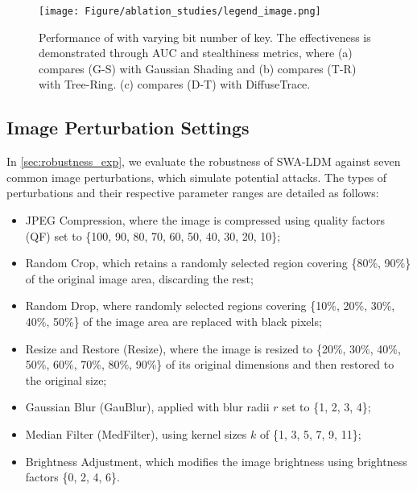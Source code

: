 
\begin{figure*}[t]
    \centering
    \begin{minipage}{\linewidth}
        \centering
        \texttt{[image: Figure/ablation\_studies/legend\_image.png]} 
    \end{minipage}
    \caption{Performance of \tool with varying bit number of key. The effectiveness is demonstrated through AUC and stealthiness metrics, where (a) compares \tool(G-S) with Gaussian Shading and (b) compares \tool(T-R) with Tree-Ring. (c) compares \tool(D-T) with DiffuseTrace.}
    
    \label{fig:keybit}
\end{figure*}

\subsection{Image Perturbation Settings}
In \cref{sec:robustness_exp}, we evaluate the robustness of SWA-LDM against seven common image perturbations, which simulate potential attacks. The types of perturbations and their respective parameter ranges are detailed as follows:
\begin{itemize}
\item {JPEG Compression}, where the image is compressed using quality factors (QF) set to \{100, 90, 80, 70, 60, 50, 40, 30, 20, 10\}; 
\item {Random Crop}, which retains a randomly selected region covering \{80\%, 90\%\} of the original image area, discarding the rest; 
\item {Random Drop}, where randomly selected regions covering \{10\%, 20\%, 30\%, 40\%, 50\%\} of the image area are replaced with black pixels; 
\item {Resize and Restore} (Resize), where the image is resized to \{20\%, 30\%, 40\%, 50\%, 60\%, 70\%, 80\%, 90\%\} of its original dimensions and then restored to the original size; 
\item {Gaussian Blur} (GauBlur), applied with blur radii \( r \) set to \{1, 2, 3, 4\}; 
\item {Median Filter} (MedFilter), using kernel sizes \( k \) of \{1, 3, 5, 7, 9, 11\}; 
\item {Brightness Adjustment}, which modifies the image brightness using brightness factors \{0, 2, 4, 6\}.
\end{itemize}

